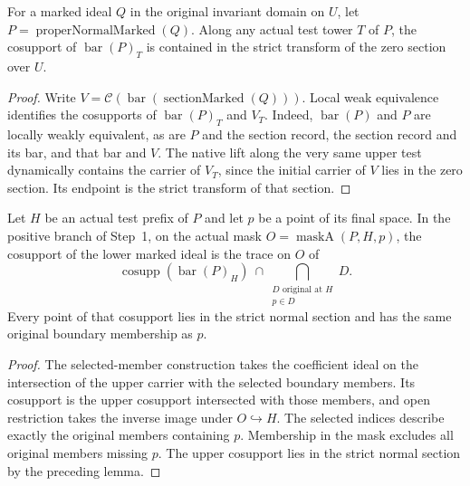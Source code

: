 \begin{lemma}
\label{hir:g1-proper-normal-bar-in-section}
\leanok
For a marked ideal $Q$ in the original invariant domain on $U$, let
$P=\operatorname{properNormalMarked}(Q)$. Along any actual test tower
$T$ of $P$, the cosupport of $\operatorname{bar}(P)_T$ is contained
in the strict transform of the zero section over $U$.
\end{lemma}
\begin{proof}
Write $V=\mathcal C(\operatorname{bar}(\operatorname{sectionMarked}(Q)))$.
Local weak equivalence identifies the cosupports of
$\operatorname{bar}(P)_T$ and $V_T$. Indeed, $\operatorname{bar}(P)$
and $P$ are locally weakly equivalent, as are $P$ and the section
record, the section record and its bar, and that bar and $V$.
The native lift along the very same upper test dynamically contains
the carrier of $V_T$, since the initial carrier of $V$ lies in the
zero section. Its endpoint is the strict transform of that section.
\end{proof}

\begin{lemma}
\label{hir:g1-positive-normal-member-cosupport}
\leanok
Let $H$ be an actual test prefix of $P$ and let $p$ be a point of its
final space. In the positive branch of Step~1, on the actual mask
$O=\operatorname{maskA}(P,H,p)$, the cosupport of the lower marked
ideal is the trace on $O$ of
\[
 \operatorname{cosupp}(\operatorname{bar}(P)_H)
 \ \cap\!\!\bigcap_{\substack{D\text{ original at }H\\p\in D}}\!D.
\]
Every point of that cosupport lies in the strict normal section and
has the same original boundary membership as $p$.
\end{lemma}
\begin{proof}
The selected-member construction takes the coefficient ideal on the
intersection of the upper carrier with the selected boundary
members. Its cosupport is the upper cosupport intersected with those
members, and open restriction takes the inverse image under
$O\hookrightarrow H$. The selected indices describe exactly the
original members containing $p$. Membership in the mask excludes
all original members missing $p$. The upper cosupport lies in the
strict normal section by the preceding lemma.
\end{proof}

